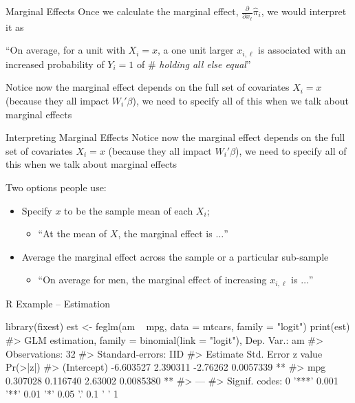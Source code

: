 \documentclass[aspectratio=169,t,11pt,table]{beamer}
\begin{document}
\begin{frame}{Marginal Effects}
  Once we calculate the marginal effect, $\frac{\partial}{\partial x_{\ell}} \hat{\pi}_i$, we would interpret it as 

  \begin{tcolorbox}[boxrule = 0pt, frame hidden, sharp corners, enhanced, borderline west = {2pt}{0pt}{zinc600}, interior hidden]
    ``On average, for a unit with $X_i = x$, a one unit larger $x_{i, \ell}$ is associated with an increased probability of $Y_i = 1$ of \# \emph{\color{blue} holding all else equal}''
  \end{tcolorbox}

  \pause
  \bigskip
  Notice now the marginal effect depends on the full set of covariates $X_i = x$ (because they all impact $W_i' \beta$), we need to specify all of this when we talk about marginal effects
\end{frame}

\begin{frame}{Interpreting Marginal Effects}
  Notice now the marginal effect depends on the full set of covariates $X_i = x$ (because they all impact $W_i' \beta$), we need to specify all of this when we talk about marginal effects

  \bigskip
  Two options people use:
  \begin{itemize}
    \item Specify $x$ to be the sample mean of each $X_i$; 
    \begin{itemize}
      \item ``At the mean of $X$, the marginal effect is $\dots$''
    \end{itemize}

    \medskip
    \item Average the marginal effect across the sample or a particular sub-sample
    \begin{itemize}
      \item ``On average for men, the marginal effect of increasing $x_{i,\ell}$ is $\dots$''
    \end{itemize}
  \end{itemize}
\end{frame}


\begin{frame}[fragile]{R Example -- Estimation}
  \begin{codeblock}
library(fixest)
est <- feglm(am ~ mpg, data = mtcars, family = "logit")
print(est)
#> GLM estimation, family = binomial(link = "logit"), Dep. Var.: am
#> Observations: 32
#> Standard-errors: IID 
#>              Estimate Std. Error  z value  Pr(>|z|)    
#> (Intercept) -6.603527   2.390311 -2.76262 0.0057339 ** 
#> mpg          0.307028   0.116740  2.63002 0.0085380 ** 
#> ---
#> Signif. codes:  0 '***' 0.001 '**' 0.01 '*' 0.05 '.' 0.1 ' ' 1
  \end{codeblock}
\end{frame}
\end{document}

